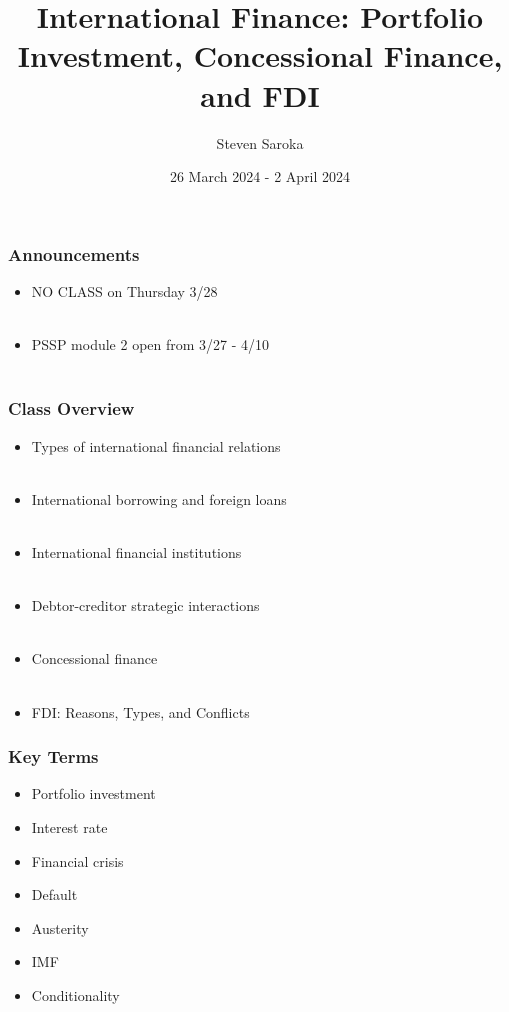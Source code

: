 \documentclass[handout]{beamer}
\title[International Finance]{\LARGE{International Finance: Portfolio Investment, Concessional Finance, and FDI}}
\author[POLI 150]{Steven Saroka}
\institute{POLI 150}
\date{26 March 2024 - 2 April 2024}
\begin{document}
\begin{frame}
\titlepage %
\end{frame}



\begin{frame} 
	\frametitle{\LARGE{Announcements}}
	\begin{itemize}
		
		\item NO CLASS on Thursday 3/28 
		\\~\\ 
		\item PSSP module 2 open from 3/27 - 4/10 
		\\~\\
		
		
	\end{itemize}
\end{frame}

\begin{frame} 
	\frametitle{\LARGE{Class Overview}}
	\begin{itemize}
		
			\item Types of international financial relations 
			\\~\\ 
			\item International borrowing and foreign loans 
			\\~\\
			\item International financial institutions
			\\~\\
			\item Debtor-creditor strategic interactions
			\\~\\
			\item Concessional finance
			\\~\\
			\item FDI: Reasons, Types, and Conflicts 
	
	\end{itemize}
\end{frame}

\begin{frame} 
	\frametitle{\LARGE{Key Terms}}
	\begin{itemize}
		\item Portfolio investment
		\item Interest rate
		\item Financial crisis
		\item Default
		\item Austerity
		\item IMF
		\item Conditionality
	\end{itemize}
\end{frame}
\end{document}

